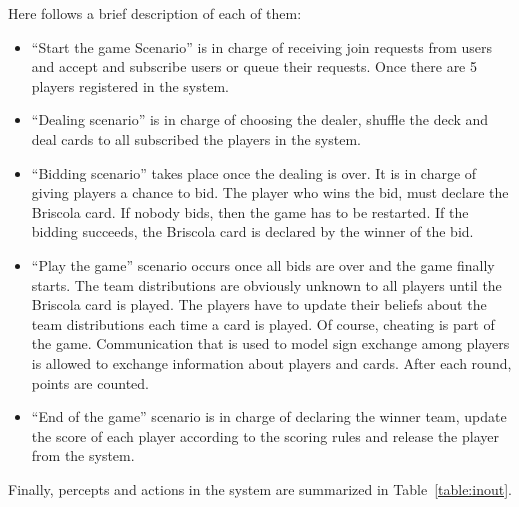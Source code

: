 \documentclass[a4paper]{article}
\begin{document}
Here follows a brief description of each of them: 
\begin{itemize}
  \item ``Start the game Scenario'' is in charge of receiving join requests from users and accept and subscribe users or queue their requests. Once there are 5 players registered in the system.
  \item ``Dealing scenario'' is in charge of choosing the dealer, shuffle the deck and deal cards to all subscribed the players in the system. 
  \item ``Bidding scenario'' takes place once the dealing is over. It is in charge of giving players a chance to bid. The player who wins the bid, must declare the Briscola card. If nobody bids, then the game has to be restarted. If the bidding succeeds, the Briscola card is declared by the winner of the bid.
  \item ``Play the game'' scenario occurs once all bids are over and the game finally starts. The team distributions are obviously unknown to all players until the Briscola card is played. The players have to update their beliefs about the team distributions each time a card is played. Of course, cheating is part of the game. Communication that is used to model sign exchange among players is allowed to exchange information about players and cards. After each round, points are counted. 
  \item ``End of the game'' scenario is in charge of declaring the winner team, update the score of each player according to the scoring rules and release the player from the system. 
\end{itemize}

Finally, percepts and actions in the system are summarized in Table~\ref{table:inout}.
\end{document}
